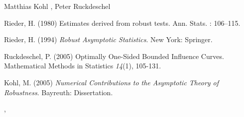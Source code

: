 \begin{Author}\relax
Matthias Kohl ,
Peter Ruckdeschel 
\end{Author}
\begin{References}\relax
Rieder, H. (1980) Estimates derived from robust tests. Ann. Stats. : 106--115.

Rieder, H. (1994) \emph{Robust Asymptotic Statistics}. New York: Springer.

Ruckdeschel, P. (2005) Optimally One-Sided Bounded Influence Curves.
Mathematical Methods in Statistics \emph{14}(1), 105-131.

Kohl, M. (2005) \emph{Numerical Contributions to the Asymptotic Theory of Robustness}. 
Bayreuth: Dissertation.
\end{References}
\begin{SeeAlso}\relax
{}, 
\end{SeeAlso}

